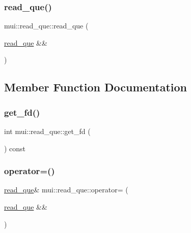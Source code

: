 \mbox{\label{classmui_1_1read__que_a7abb6753eebb99018c77b3d8575de563}} 
\subsubsection{\texorpdfstring{read\+\_\+que()}{read\_que()}\hspace{0.1cm}{\footnotesize\ttfamily [2/2]}}
{\footnotesize\ttfamily mui\+::read\+\_\+que\+::read\+\_\+que (\begin{DoxyParamCaption}\item[{\hyperlink{classmui_1_1read__que}{read\+\_\+que} \&\&}]{ }\end{DoxyParamCaption})\hspace{0.3cm}{\ttfamily [default]}}



\subsection{Member Function Documentation}
\mbox{\label{classmui_1_1read__que_a6d529eb11a844c0c65764b8eeb9c801b}} 
\subsubsection{\texorpdfstring{get\+\_\+fd()}{get\_fd()}}
{\footnotesize\ttfamily int mui\+::read\+\_\+que\+::get\+\_\+fd (\begin{DoxyParamCaption}{ }\end{DoxyParamCaption}) const\hspace{0.3cm}{\ttfamily [inline]}}

\mbox{\label{classmui_1_1read__que_aeea72872bc6dcbca841543bdf4000657}} 
\subsubsection{\texorpdfstring{operator=()}{operator=()}}
{\footnotesize\ttfamily \hyperlink{classmui_1_1read__que}{read\+\_\+que}\& mui\+::read\+\_\+que\+::operator= (\begin{DoxyParamCaption}\item[{\hyperlink{classmui_1_1read__que}{read\+\_\+que} \&\&}]{ }\end{DoxyParamCaption})\hspace{0.3cm}{\ttfamily [default]}}

